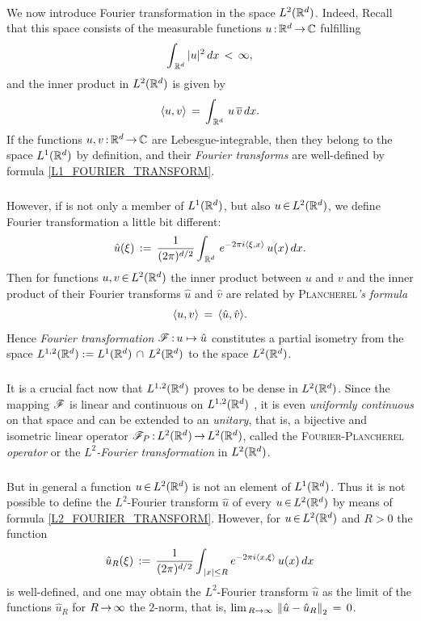 \documentclass[11pt,twoside]{article}
\begin{document}
\paragraph{} %
We now introduce Fourier transformation in the space $L^2({\mathbb{R}}^d)$.
Indeed,
Recall that
this space consists of the measurable functions $u {\,:\,} {\mathbb{R}}^d {\,\to\,} {\mathbb{C}}$ fulfilling
\[
\int_{\,\Rd} \, \abs{u} ^2 \, dx \, < \, \infty,
\]
and the inner product in $L^2({\mathbb{R}}^d)$ is given by
\[
\langle u,v \rangle \,=\, \int_{\,{\mathbb{R}}^d} \, u\,\overline{v} \, dx.
\]
If the functions $u,v {\,:\,} {\mathbb{R}}^d {\,\to\,} {\mathbb{C}}$ are Lebesgue-integrable,
then they belong to the space $L^1({\mathbb{R}}^d)$ by definition,
and their \textit{Fourier transforms} are well-defined
by formula \eqref{L1_FOURIER_TRANSFORM}.

\subparagraph{}
However, 
if is not only a member of $L^1({\mathbb{R}}^d)$, 
but also $u {\,\in\,} L^2({\mathbb{R}}^d)$,
we define Fourier transformation a little bit different:
\begin{equation}\label{L2_FOURIER_TRANSFORM}
\hat{u}(\xi) \,:=\,
\frac{1}{(2 \pi)^{d/2}}
\int_{\,{\mathbb{R}}^d} \, e^{-2 \pi i \langle \xi,x \rangle} \, u(x) \, dx.
\end{equation}
Then for functions $u,v {\,\in\,} L^2({\mathbb{R}}^d)$ 
the inner product between $u$ and $v$
and the inner product of their Fourier transforms $\hat{u}$ and $\hat{v}$
are related by \textsc{Plancherel}\textit{'s formula}
\[
\langle u,v \rangle \,=\, \langle  \hat{u} ,\hat{v}  \rangle.
\]
Hence \textit{Fourier transformation} $\mathscr{F} {\,:\,} u \mapsto \hat{u} $
constitutes a partial isometry from the space
$L^{1,2}({\mathbb{R}}^d) := L^1({\mathbb{R}}^d) \, \cap \, L^2({\mathbb{R}}^d)$
to the space $L^2({\mathbb{R}}^d)$.

\subparagraph{}
It is a crucial fact now
that $L^{1,2}({\mathbb{R}}^d)$ proves to be dense in $L^2({\mathbb{R}}^d)$.
Since the mapping $\mathscr{F}$ is linear and continuous on $L^{1,2}({\mathbb{R}}^d)$ ,
it is even \textit{uniformly continuous} on that space
and can be extended to an \textit{unitary},
that is,
a bijective and isometric linear operator
$\mathscr{F}_P {\,:\,} L^2({\mathbb{R}}^d) {\,\to\,} L^2({\mathbb{R}}^d)$,
called the \textsc{Fourier-Plancherel} \textit{operator}
or the \textit{$L^2$-Fourier transformation} in $L^2({\mathbb{R}}^d)$.

\subparagraph{}
But in general a function $u {\,\in\,} L^2({\mathbb{R}}^d)$ is not an element of $L^1({\mathbb{R}}^d)$.
Thus it is not possible to define the $L^2$-Fourier transform $\hat{u}$
of every $u {\,\in\,} L^2({\mathbb{R}}^d)$
by means of formula \eqref{L2_FOURIER_TRANSFORM}.
However,
for $u {\,\in\,} L^2({\mathbb{R}}^d)$ and $R > 0$ the function
\[
\hat{u} _R(\xi) \eqdef
\frac{1}{(2 \pi)^{d/2}}
\int_{\,\abs{x} \leq R}
e^{-2 \pi i \scalar{x}{\xi}} \, u(x) \, dx
\]
is well-defined,
and one may obtain the $L^2$-Fourier transform $\hat{u}$ 
as the limit of the functions $\hat{u} _R$ for $R {\,\to\,} \infty$
{\wrt} the $2$-norm,
that is,
$\lim_{\,R \to \infty} \, \left\lVert  \hat{u} - \hat{u} _R \right\rVert_2 \,=\, 0$.
\end{document}

